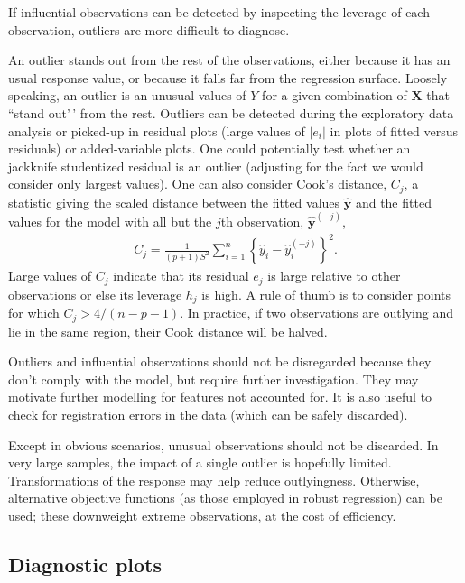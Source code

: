 \documentclass[
  11pt,
  letterpaper,
]{book}
\theoremstyle{definition}
\theoremstyle{definition}
\theoremstyle{definition}
\theoremstyle{remark}
\begin{document}
If influential observations can be detected by inspecting the leverage of each observation, outliers are more difficult to diagnose.

An outlier stands out from the rest of the observations, either because it has an usual response value, or because it falls far from the regression surface.
Loosely speaking, an outlier is an unusual values of \(Y\) for a given combination of \(\mathbf{X}\) that ``stand out'\,' from the rest.
Outliers can be detected during the exploratory data analysis or picked-up in residual plots (large values of \(|e_i|\) in plots of fitted versus residuals) or added-variable plots. One could potentially test whether an jackknife studentized residual is an outlier (adjusting for the fact we would consider only largest values). One can also consider Cook's distance, \(C_j\), a statistic giving the scaled distance between the fitted values \(\hat{\boldsymbol{y}}\) and the fitted values for the model with all but the \(j\)th observation, \(\hat{\boldsymbol{y}}^{(-j)}\),
\begin{align*}
C_j = \frac{1}{(p+1)S^2} \sum_{i=1}^n \left\{\hat{y}_i - \hat{y}_{i}^{(-j)}\right\}^2.
\end{align*}
Large values of \(C_j\) indicate that its residual \(e_j\) is large relative to other observations or else its leverage \(h_j\) is high. A rule of thumb is to consider points for which \(C_j > 4/(n-p-1)\). In practice, if two observations are outlying and lie in the same region, their Cook distance will be halved.

Outliers and influential observations should not be disregarded because they don't comply with the model, but require further investigation. They may motivate further modelling for features not accounted for. It is also useful to check for registration errors in the data (which can be safely discarded).

Except in obvious scenarios, unusual observations should not be discarded. In very large samples, the impact of a single outlier is hopefully limited. Transformations of the response may help reduce outlyingness. Otherwise, alternative objective functions (as those employed in robust regression) can be used; these downweight extreme observations, at the cost of efficiency.

\hypertarget{diagnostic-plots}{%
\subsection{Diagnostic plots}\label{diagnostic-plots}}
\end{document}
